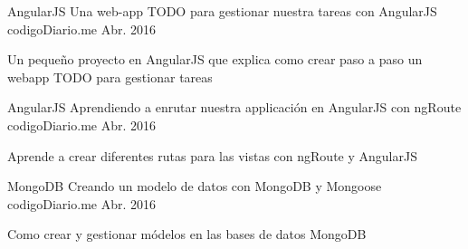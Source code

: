 

\begin{cventries}

  \cventry
    {AngularJS} %
    {Una web-app TODO para gestionar nuestra tareas con AngularJS} %
    {codigoDiario.me} %
    {Abr. 2016} %
    {
      \begin{cvitems} %
        \item {Un pequeño proyecto en AngularJS que explica como crear paso a paso un webapp TODO para gestionar tareas}
      \end{cvitems}
    }

  \cventry
    {AngularJS} %
    {Aprendiendo a enrutar nuestra applicación en AngularJS con ngRoute} %
    {codigoDiario.me} %
    {Abr. 2016} %
    {
      \begin{cvitems} %
        \item {Aprende a crear diferentes rutas para las vistas con ngRoute y AngularJS}
      \end{cvitems}
    }


  \cventry
    {MongoDB} %
    {Creando un modelo de datos con MongoDB y Mongoose} %
    {codigoDiario.me} %
    {Abr. 2016} %
    {
      \begin{cvitems} %
        \item {Como crear y gestionar módelos en las bases de datos MongoDB}
      \end{cvitems}
    }

\end{cventries}
